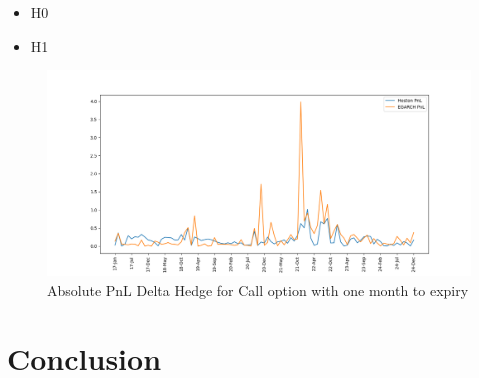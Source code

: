 \documentclass[12pt,a4paper]{article}
\numberwithin{equation}{section}
\begin{document}
\begin{itemize}
\item H0
\item H1
\end{itemize}

\begin{figure}[h!] 
\includegraphics[scale=1,width=1\linewidth,height=0.4\textheight]{deltahedge_pnl.png}
\caption{Absolute PnL Delta Hedge for Call option with one month to expiry}
\label{deltahegde}
\end{figure}



\newpage
\section{Conclusion}
\end{document}
